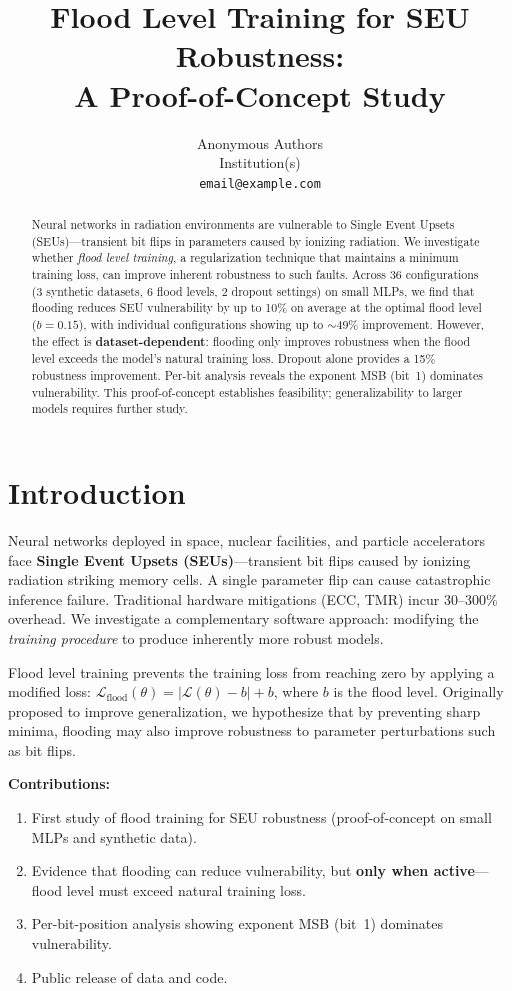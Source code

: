 \documentclass{article}
\title{Flood Level Training for SEU Robustness:\\A Proof-of-Concept Study}
\author{%
  Anonymous Authors \\
  Institution(s) \\
  \texttt{email@example.com} \\
}
\begin{document}
\maketitle

\begin{abstract}
	Neural networks in radiation environments are vulnerable to Single Event Upsets (SEUs)---transient bit flips in parameters caused by ionizing radiation. We investigate whether \textit{flood level training}, a regularization technique that maintains a minimum training loss, can improve inherent robustness to such faults. Across 36 configurations (3 synthetic datasets, 6 flood levels, 2 dropout settings) on small MLPs, we find that flooding reduces SEU vulnerability by up to 10\% on average at the optimal flood level ($b{=}0.15$), with individual configurations showing up to ${\sim}49\%$ improvement. However, the effect is \textbf{dataset-dependent}: flooding only improves robustness when the flood level exceeds the model's natural training loss. Dropout alone provides a 15\% robustness improvement. Per-bit analysis reveals the exponent MSB (bit~1) dominates vulnerability. This proof-of-concept establishes feasibility; generalizability to larger models requires further study.
\end{abstract}

\section{Introduction}

Neural networks deployed in space, nuclear facilities, and particle accelerators face \textbf{Single Event Upsets (SEUs)}---transient bit flips caused by ionizing radiation striking memory cells. A single parameter flip can cause catastrophic inference failure. Traditional hardware mitigations (ECC, TMR) incur 30--300\% overhead. We investigate a complementary software approach: modifying the \textit{training procedure} to produce inherently more robust models.

Flood level training \cite{ishida2020we} prevents the training loss from reaching zero by applying a modified loss: $\mathcal{L}_{\text{flood}}(\theta) = |\mathcal{L}(\theta) - b| + b$, where $b$ is the flood level. Originally proposed to improve generalization, we hypothesize that by preventing sharp minima, flooding may also improve robustness to parameter perturbations such as bit flips.

\textbf{Contributions:}
\begin{enumerate}
	\item First study of flood training for SEU robustness (proof-of-concept on small MLPs and synthetic data).
	\item Evidence that flooding can reduce vulnerability, but \textbf{only when active}---flood level must exceed natural training loss.
	\item Per-bit-position analysis showing exponent MSB (bit~1) dominates vulnerability.
	\item Public release of data and code.
\end{enumerate}
\end{document}
